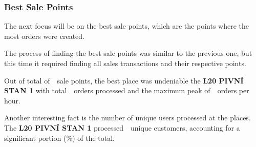 
\subsubsection{Best Sale Points}
\label{subsubsec:analysis-best-sale-points}

The next focus will be on the best sale points, which are the points where the most orders were created.


The process of finding the best sale points was similar to the previous one, but this time it required finding all sales transactions and their respective points.

Out of total of~~sale points, the best place was undeniable the \textbf{L20 PIVNÍ STAN 1} with total~~orders processed and the maximum peak of~~orders per hour.

Another interesting fact is the number of unique users processed at the places.
The \textbf{L20 PIVNÍ STAN 1} processed~~unique customers, accounting for a significant portion (\%) of the total.

